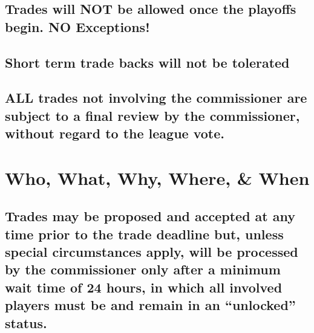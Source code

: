 \documentclass[
]{book}
\begin{document}
\hypertarget{trades-will-not-be-allowed-once-the-playoffs-begin.-no-exceptions}{%
\subsection{Trades will NOT be allowed once the playoffs begin. NO Exceptions!}\label{trades-will-not-be-allowed-once-the-playoffs-begin.-no-exceptions}}

\hypertarget{short-term-trade-backs-will-not-be-tolerated}{%
\subsection{Short term trade backs will not be tolerated}\label{short-term-trade-backs-will-not-be-tolerated}}

\hypertarget{all-trades-not-involving-the-commissioner-are-subject-to-a-final-review-by-the-commissioner-without-regard-to-the-league-vote.}{%
\subsection{ALL trades not involving the commissioner are subject to a final review by the commissioner, without regard to the league vote.}\label{all-trades-not-involving-the-commissioner-are-subject-to-a-final-review-by-the-commissioner-without-regard-to-the-league-vote.}}

\hypertarget{who-what-why-where-when}{%
\section{Who, What, Why, Where, \& When}\label{who-what-why-where-when}}

\hypertarget{trades-may-be-proposed-and-accepted-at-any-time-prior-to-the-trade-deadline-but-unless-special-circumstances-apply-will-be-processed-by-the-commissioner-only-after-a-minimum-wait-time-of-24-hours-in-which-all-involved-players-must-be-and-remain-in-an-unlocked-status.}{%
\subsection{Trades may be proposed and accepted at any time prior to the trade deadline but, unless special circumstances apply, will be processed by the commissioner only after a minimum wait time of 24 hours, in which all involved players must be and remain in an ``unlocked'' status.}\label{trades-may-be-proposed-and-accepted-at-any-time-prior-to-the-trade-deadline-but-unless-special-circumstances-apply-will-be-processed-by-the-commissioner-only-after-a-minimum-wait-time-of-24-hours-in-which-all-involved-players-must-be-and-remain-in-an-unlocked-status.}}
\end{document}

